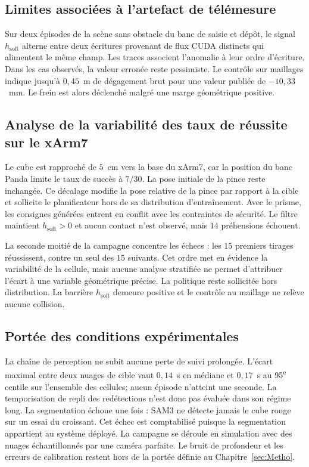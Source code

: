 \subsection*{Limites associées à l'artefact de télémesure}
Sur deux épisodes de la scène sans obstacle du banc de saisie et dépôt, le signal $h_{\mathrm{soft}}$ alterne entre deux écritures provenant de flux \ac{CUDA} distincts qui alimentent le même champ. Les traces associent l'anomalie à leur ordre d'écriture. Dans les cas observés, la valeur erronée reste pessimiste. Le contrôle sur maillages indique jusqu'à $0{,}45$~m de dégagement brut pour une valeur publiée de $-10{,}33$~mm. Le frein est alors déclenché malgré une marge géométrique positive.

\subsection*{Analyse de la variabilité des taux de réussite sur le xArm7}
Le cube est rapproché de $5$~cm vers la base du xArm7, car la position du banc Panda limite le taux de succès à $7/30$. La pose initiale de la pince reste inchangée. Ce décalage modifie la pose relative de la pince par rapport à la cible et sollicite le planificateur hors de sa distribution d'entraînement. Avec le prisme, les consignes générées entrent en conflit avec les contraintes de sécurité. Le filtre maintient $h_{\mathrm{soft}}>0$ et aucun contact n'est observé, mais $14$ préhensions échouent.

La seconde moitié de la campagne concentre les échecs : les $15$ premiers tirages réussissent, contre un seul des $15$ suivants. Cet ordre met en évidence la variabilité de la cellule, mais aucune analyse stratifiée ne permet d'attribuer l'écart à une variable géométrique précise. La politique reste sollicitée hors distribution. La barrière $h_{\mathrm{soft}}$ demeure positive et le contrôle au maillage ne relève aucune collision.

\subsection*{Portée des conditions expérimentales}
La chaîne de perception ne subit aucune perte de suivi prolongée. L'écart maximal entre deux nuages de cible vaut $0{,}14$~s en médiane et $0{,}17$~s au 95\textsuperscript{e} centile sur l'ensemble des cellules; aucun épisode n'atteint une seconde. La temporisation de repli des redétections n'est donc pas évaluée dans son régime long. La segmentation échoue une fois : SAM3 ne détecte jamais le cube rouge sur un essai du croissant. Cet échec est comptabilisé puisque la segmentation appartient au système déployé. La campagne se déroule en simulation avec des nuages échantillonnés par une caméra parfaite. Le bruit de profondeur et les erreurs de calibration restent hors de la portée définie au Chapitre~\ref{sec:Metho}.

